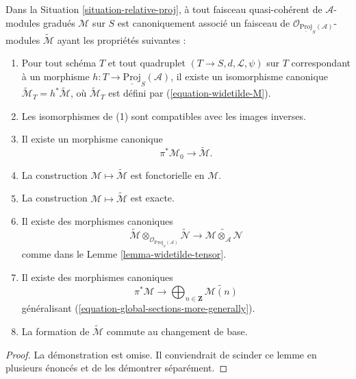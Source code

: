 \begin{lemma}
\label{lemma-relative-proj-modules}
Dans la Situation \ref{situation-relative-proj}, à tout faisceau
quasi-cohérent de $\mathcal{A}$-modules gradués $\mathcal{M}$ sur $S$ est
canoniquement associé un faisceau de
$\mathcal{O}_{\underline{\text{Proj}}_S(\mathcal{A})}$-modules
$\widetilde{\mathcal{M}}$ ayant les
propriétés suivantes :
\begin{enumerate}
\item Pour tout schéma $T$ et tout quadruplet
$(T \to S, d, \mathcal{L}, \psi)$ sur $T$ correspondant à un morphisme
$h : T \to \underline{\text{Proj}}_S(\mathcal{A})$, il existe un
isomorphisme canonique
$\widetilde{\mathcal{M}}_T = h^*\widetilde{\mathcal{M}}$,
où $\widetilde{\mathcal{M}}_T$ est défini par (\ref{equation-widetilde-M}).
\item Les isomorphismes de (1) sont compatibles avec les images inverses.
\item Il existe un morphisme canonique
$$
\pi^*\mathcal{M}_0 \longrightarrow \widetilde{\mathcal{M}}.
$$
\item La construction $\mathcal{M} \mapsto \widetilde{\mathcal{M}}$ est
fonctorielle en $\mathcal{M}$.
\item La construction $\mathcal{M} \mapsto \widetilde{\mathcal{M}}$ est
exacte.
\item Il existe des morphismes canoniques
$$
\widetilde{\mathcal{M}}
\otimes_{\mathcal{O}_{\underline{\text{Proj}}_S(\mathcal{A})}}
\widetilde{\mathcal{N}}
\longrightarrow
\widetilde{\mathcal{M} \otimes_\mathcal{A} \mathcal{N}}
$$
comme dans le Lemme \ref{lemma-widetilde-tensor}.
\item Il existe des morphismes canoniques
$$
\pi^*\mathcal{M}
\longrightarrow
\bigoplus\nolimits_{n \in \mathbf{Z}}
\widetilde{\mathcal{M}(n)}
$$
généralisant (\ref{equation-global-sections-more-generally}).
\item La formation de $\widetilde{\mathcal{M}}$
commute au changement de base.
\end{enumerate}
\end{lemma}

\begin{proof}
La démonstration est omise. Il conviendrait de scinder ce lemme en plusieurs énoncés et de les démontrer séparément.
\end{proof}












